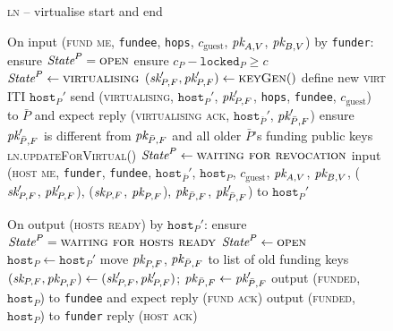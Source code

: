 \begin{figure}[H]
  \begin{processbox}{\textsc{ln} -- virtualise start and end}
    \begin{algorithmic}[1]
      \State On input (\textsc{fund me}, \texttt{fundee}, \texttt{hops},
      $c_{\mathrm{guest}}$, $\textit{pk}_{A, V}$, $\textit{pk}_{B, V}$) by \texttt{funder}:
      \Indent
        \State ensure $\textit{State}^P = \textsc{open}$
        \State ensure $c_P - \texttt{locked}_P \geq c$
        \State $\textit{State}^P \gets \textsc{virtualising}$
        \State $(\textit{sk}_{P, F}', \textit{pk}_{P, F}') \gets \textsc{keyGen}()$
        \State define new \textsc{virt} ITI $\texttt{host}_P'$
        \State send (\textsc{virtualising}, $\texttt{host}_P'$, $\textit{pk}_{P, F}'$,
        \texttt{hops}, \texttt{fundee}, $c_{\mathrm{guest}}$) to $\bar{P}$ and
        expect reply (\textsc{virtualising ack}, $\texttt{host}_{\bar{P}}'$,
        $\textit{pk}_{\bar{P}, F}'$)
        \State ensure $\textit{pk}_{\bar{P}, F}'$ is different from $\textit{pk}_{\bar{P}, F}$ and
        all older $\bar{P}$'s funding public keys
        \State \textsc{ln}.\textsc{updateForVirtual}()
        \State $\textit{State}^P \gets \textsc{waiting for revocation}$
        \State input (\textsc{host me}, \texttt{funder}, \texttt{fundee},
        $\texttt{host}_{\bar{P}}'$, $\texttt{host}_P$, $c_{\mathrm{guest}}$,
        $\textit{pk}_{A, V}$, $\textit{pk}_{B, V}$, ($\textit{sk}_{P, F}'$, $\textit{pk}_{P, F}'$), ($\textit{sk}_{P, F}$,
        $\textit{pk}_{P, F}$), $\textit{pk}_{\bar{P}, F}$, $\textit{pk}_{\bar{P}, F}'$) to
        $\texttt{host}_P'$
      \EndIndent
      \Statex

      \State On output (\textsc{hosts ready}) by $\texttt{host}_P'$:
      \Indent
        \State ensure $\textit{State}^P = \textsc{waiting for hosts ready}$
        \State $\textit{State}^P \gets \textsc{open}$
        \State $\texttt{host}_P \gets \texttt{host}_P'$ 
        \State move $\textit{pk}_{P, F}$, $\textit{pk}_{\bar{P}, F}$ to list of old funding keys
        \State $(\textit{sk}_{P, F}, \textit{pk}_{P, F}) \gets (\textit{sk}_{P, F}', \textit{pk}_{P, F}')$;
        $\textit{pk}_{\bar{P}, F} \gets \textit{pk}_{\bar{P}, F}'$
         
          \State output (\textsc{funded}, $\texttt{host}_P$) to \texttt{fundee}
          and expect reply (\textsc{fund ack})
         
          \State output (\textsc{funded}, $\texttt{host}_P$) to \texttt{funder}
        \EndIf
        \State reply (\textsc{host ack})
      \EndIndent
    \end{algorithmic}
  \end{processbox}
  \caption{}
  \label{code:ln:virtualise:start-end}
\end{figure}

